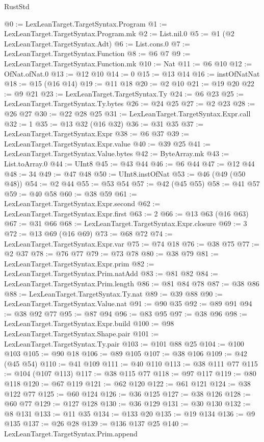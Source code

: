 \begin{lexlean}{RustStd}
\begin{coremodule}
@0 := LexLeanTarget.TargetSyntax.Program
@1 := LexLeanTarget.TargetSyntax.Program.mk
@2 := List.nil.{0}
@5 := @1 (@2 LexLeanTarget.TargetSyntax.Adt)
@6 := List.cons.{0}
@7 := LexLeanTarget.TargetSyntax.Function
@8 := @6 @7
@9 := LexLeanTarget.TargetSyntax.Function.mk
@10 := Nat
@11 := @6 @10
@12 := OfNat.ofNat.{0}
@13 := @12 @10
@14 := 0
@15 := @13 @14
@16 := instOfNatNat
@18 := @15 (@16 @14)
@19 := @11 @18
@20 := @2 @10
@21 := @19 @20
@22 := @9 @21
@23 := LexLeanTarget.TargetSyntax.Ty
@24 := @6 @23
@25 := LexLeanTarget.TargetSyntax.Ty.bytes
@26 := @24 @25
@27 := @2 @23
@28 := @26 @27
@30 := @22 @28 @25
@31 := LexLeanTarget.TargetSyntax.Expr.call
@32 := 1
@35 := @13 @32 (@16 @32)
@36 := @31 @35
@37 := LexLeanTarget.TargetSyntax.Expr
@38 := @6 @37
@39 := LexLeanTarget.TargetSyntax.Expr.value
@40 := @39 @25
@41 := LexLeanTarget.TargetSyntax.Value.bytes
@42 := ByteArray.mk
@43 := List.toArray.{0}
@44 := UInt8
@45 := @43 @44
@46 := @6 @44
@47 := @12 @44
@48 := 34
@49 := @47 @48
@50 := UInt8.instOfNat
@53 := @46 (@49 (@50 @48))
@54 := @2 @44
@55 := @53 @54
@57 := @42 (@45 @55)
@58 := @41 @57
@59 := @40 @58
@60 := @38 @59
@61 := LexLeanTarget.TargetSyntax.Expr.second
@62 := LexLeanTarget.TargetSyntax.Expr.first
@63 := 2
@66 := @13 @63 (@16 @63)
@67 := @31 @66
@68 := LexLeanTarget.TargetSyntax.Expr.closure
@69 := 3
@72 := @13 @69 (@16 @69)
@73 := @68 @72
@74 := LexLeanTarget.TargetSyntax.Expr.var
@75 := @74 @18
@76 := @38 @75
@77 := @2 @37
@78 := @76 @77
@79 := @73 @78
@80 := @38 @79
@81 := LexLeanTarget.TargetSyntax.Expr.prim
@82 := LexLeanTarget.TargetSyntax.Prim.natAdd
@83 := @81 @82
@84 := LexLeanTarget.TargetSyntax.Prim.length
@86 := @81 @84 @78
@87 := @38 @86
@88 := LexLeanTarget.TargetSyntax.Ty.nat
@89 := @39 @88
@90 := LexLeanTarget.TargetSyntax.Value.nat
@91 := @90 @35
@92 := @89 @91
@94 := @38 @92 @77
@95 := @87 @94
@96 := @83 @95
@97 := @38 @96
@98 := LexLeanTarget.TargetSyntax.Expr.build
@100 := @98 LexLeanTarget.TargetSyntax.Shape.pair
@101 := LexLeanTarget.TargetSyntax.Ty.pair
@103 := @101 @88 @25
@104 := @100 @103
@105 := @90 @18
@106 := @89 @105
@107 := @38 @106
@109 := @42 (@45 @54)
@110 := @41 @109
@111 := @40 @110
@113 := @38 @111 @77
@115 := @104 (@107 @113)
@117 := @38 @115 @77
@118 := @97 @117
@119 := @80 @118
@120 := @67 @119
@121 := @62 @120
@122 := @61 @121
@124 := @38 @122 @77
@125 := @60 @124
@126 := @36 @125
@127 := @38 @126
@128 := @60 @77
@129 := @127 @128
@130 := @36 @129
@131 := @30 @130
@132 := @8 @131
@133 := @11 @35
@134 := @133 @20
@135 := @19 @134
@136 := @9 @135
@137 := @26 @28
@139 := @136 @137 @25
@140 := LexLeanTarget.TargetSyntax.Prim.append

\end{coremodule}
\end{lexlean}
